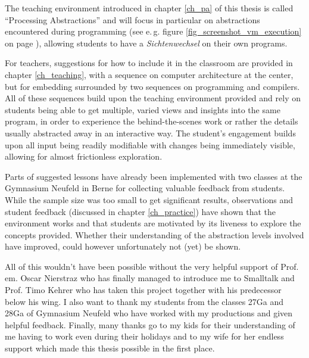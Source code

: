 The teaching environment introduced in chapter \ref{ch_pa} of this thesis is called ``Processing Abstractions'' and will focus in particular on abstractions encountered during programming (see e.\,g. figure \ref{fig_screenshot_vm_execution} on page \pageref{fig_screenshot_vm_execution}), allowing students to have a \emph{Sichtenwechsel} on their own programs.

For teachers, suggestions for how to include it in the classroom are provided in chapter \ref{ch_teaching}, with a sequence on computer architecture at the center, but for embedding surrounded by two sequences on programming and compilers. All of these sequences build upon the teaching environment provided and rely on students being able to get multiple, varied views and insights into the same program, in order to experience the behind-the-scenes work or rather the details usually abstracted away in an interactive way. The student's engagement builds upon all input being readily modifiable with changes being immediately visible, allowing for almost frictionless exploration.

Parts of suggested lessons have already been implemented with two classes at the Gymnasium Neufeld in Berne for collecting valuable feedback from students. While the sample size was too small to get significant results, observations and student feedback (discussed in chapter \ref{ch_practice}) have shown that the environment works and that students are motivated by its liveness to explore the concepts provided. Whether their understanding of the abstraction levels involved have improved, could however unfortunately not (yet) be shown.

All of this wouldn't have been possible without the very helpful support of Prof.\,em. Oscar Nierstraz who has finally managed to introduce me to Smalltalk and Prof. Timo Kehrer who has taken this project together with his predecessor below his wing. I also want to thank my students from the classes 27Ga and 28Ga of Gymnasium Neufeld who have worked with my productions and given helpful feedback. Finally, many thanks go to my kids for their understanding of me having to work even during their holidays and to my wife for her endless support which made this thesis possible in the first place.
